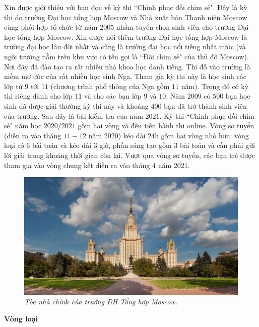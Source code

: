 \begin{multicols}{2}
	Xin được giới thiệu với bạn đọc về kỳ thi ``Chinh phục đồi chim sẻ". Đây là kỳ thi do trường Đại học tổng hợp Moscow và Nhà xuất bản Thanh niên Moscow cùng phối hợp tổ chức từ năm $2005$ nhằm tuyển chọn sinh viên cho trường Đại học tổng hợp Moscow. Xin được nói thêm trường Đại học tổng hợp Moscow là trường đại học lâu đời nhất và cũng là trường đại học nổi tiếng nhất nước (và ngôi trường nằm trên khu vực có tên gọi là ``Đồi chim sẻ" của thủ đô Moscow). Nơi đây đã đào tạo ra rất nhiều nhà khoa học danh tiếng. Thi đỗ vào trường là niềm mơ ước của rất nhiều học sinh Nga. Tham gia kỳ thi này là học sinh các lớp từ $9$ tới $11$ (chương trình phổ thông của Nga gồm $11$ năm). Trong đó có kỳ thi riêng dành cho lớp $11$ và cho các bạn lớp $9$ và $10$. Năm $2009$ có $500$ bạn học sinh đã được giải thưởng kỳ thi này và khoảng $400$ bạn đã trở thành sinh viên của trường. Sau đây là bài kiểm tra của năm $2021$.
	\vskip 0.1cm
	Kỳ thi ``Chinh phục đồi chim sẻ" năm học $2020/2021$ gồm hai vòng và đều tiến hành thi online. Vòng sơ tuyển (diễn ra vào tháng $11-12$ năm $2020$) kéo dài $24$h gồm hai vòng nhỏ hơn: vòng loại có $6$ bài toán và kéo dài $3$ giờ, phần sáng tạo gồm $3$ bài toán và cần phải gửi lời giải trong khoảng thời gian còn lại. Vượt qua vòng sơ tuyển, các bạn trẻ được tham gia vào vòng chung kết diễn ra vào tháng $4$ năm $2021$.
	\begin{figure}[H]
		\centering
		\vspace*{-5pt}
		\captionsetup{labelformat= empty, justification=centering}
		\includegraphics[width=1\linewidth]{Moscow_State_University}
		\caption{\small\textit{\color{cackithi}Tòa nhà chính của trường ĐH Tổng hợp Moscow.}}
		\vspace*{-10pt}
	\end{figure}
	\textbf{\color{cackithi}Vòng loại}

\end{multicols}
